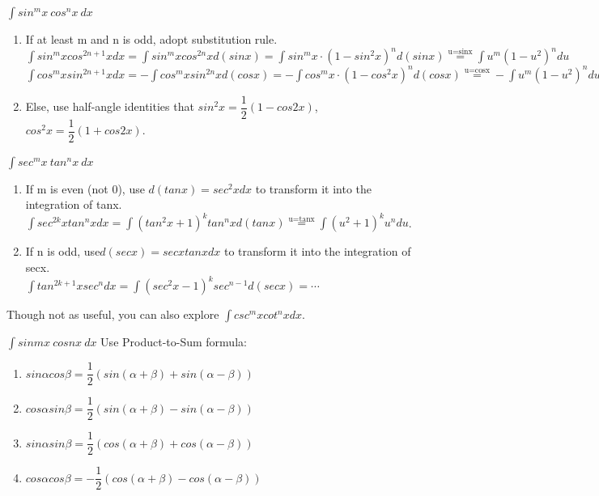 \documentclass{beamer}
\begin{document}
\begin{frame}{$\int sin^mx\ cos^nx\ dx$}
\begin{enumerate}
    \item If at least m and n is odd, adopt substitution rule.
    \bigskip
    $\int sin^mxcos^{2n+1}xdx=\int sin^mxcos^{2n}xd(sinx)=\int sin^mx\cdot(1-sin^2x)^nd(sinx)\overset{\text{u=sinx}}{=}\int u^m(1-u^2)^ndu$\\
    \bigskip
    $\int cos^mxsin^{2n+1}xdx=-\int cos^mxsin^{2n}xd(cosx)=-\int cos^mx\cdot(1-cos^2x)^nd(cosx)\overset{\text{u=cosx}}{=}-\int u^m(1-u^2)^ndu$\\
    \bigskip
    \item Else, use half-angle identities that $sin^2x=\dfrac{1}{2}(1-cos2x)$, $cos^2x=\dfrac{1}{2}(1+cos2x)$.
    
\end{enumerate}
\end{frame}

\begin{frame}{$\int sec^mx\ tan^nx\ dx$}
    \begin{enumerate}
        \item If m is even (not 0), use $d(tanx)=sec^2xdx$ to transform it into the integration of tanx.\\
        \bigskip
        $\int sec^{2k}xtan^nxdx=\int (tan^2x+1)^ktan^nxd(tanx)\overset{\text{u=tanx}}{=}\int (u^2+1)^ku^ndu$.
        \item If n is odd, use$d(secx)=secxtanxdx$ to transform it into the integration of secx.\\
        \bigskip
        $\int tan^{2k+1}xsec^ndx=\int (sec^2x-1)^ksec^{n-1}d(secx)=\cdots$
    \end{enumerate}
    Though not as useful, you can also explore $\int csc^mxcot^nxdx$.
\end{frame}

\begin{frame}{$\int sin mx\ cos nx\ dx$}
    Use Product-to-Sum formula:
    \begin{enumerate}
        \item $sin\alpha cos\beta=\dfrac{1}{2}(sin(\alpha+\beta)+sin(\alpha-\beta))$
        \item $cos\alpha sin\beta=\dfrac{1}{2}(sin(\alpha+\beta)-sin(\alpha-\beta))$
        \item $sin\alpha sin\beta=\dfrac{1}{2}(cos(\alpha+\beta)+cos(\alpha-\beta))$
        \item $cos\alpha cos\beta=-\dfrac{1}{2}(cos(\alpha+\beta)-cos(\alpha-\beta))$
    \end{enumerate}
\end{frame}
\end{document}
